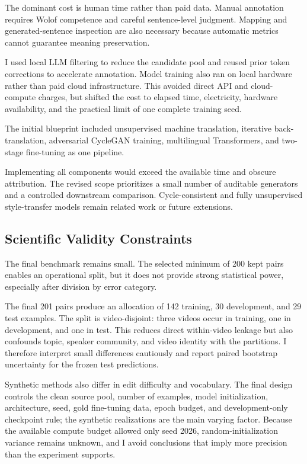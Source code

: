 \documentclass[12pt, a4paper, twoside, openany]{report}
\begin{document}
The dominant cost is human time rather than paid data. Manual annotation requires Wolof competence and careful sentence-level judgment. Mapping and generated-sentence inspection are also necessary because automatic metrics cannot guarantee meaning preservation.

I used local LLM filtering to reduce the candidate pool and reused prior token corrections to accelerate annotation. Model training also ran on local hardware rather than paid cloud infrastructure. This avoided direct API and cloud-compute charges, but shifted the cost to elapsed time, electricity, hardware availability, and the practical limit of one complete training seed.

The initial blueprint included unsupervised machine translation, iterative back-translation, adversarial CycleGAN training, multilingual Transformers, and two-stage fine-tuning as one pipeline.

Implementing all components would exceed the available time and obscure attribution. The revised scope prioritizes a small number of auditable generators and a controlled downstream comparison. Cycle-consistent and fully unsupervised style-transfer models remain related work or future extensions.

\medskip

\subsection{Scientific Validity Constraints}

The final benchmark remains small. The selected minimum of 200 kept pairs enables an operational split, but it does not provide strong statistical power, especially after division by error category.

The final 201 pairs produce an allocation of 142 training, 30 development, and 29 test examples. The split is video-disjoint: three videos occur in training, one in development, and one in test. This reduces direct within-video leakage but also confounds topic, speaker community, and video identity with the partitions. I therefore interpret small differences cautiously and report paired bootstrap uncertainty for the frozen test predictions.

Synthetic methods also differ in edit difficulty and vocabulary. The final design controls the clean source pool, number of examples, model initialization, architecture, seed, gold fine-tuning data, epoch budget, and development-only checkpoint rule; the synthetic realizations are the main varying factor. Because the available compute budget allowed only seed 2026, random-initialization variance remains unknown, and I avoid conclusions that imply more precision than the experiment supports.
\end{document}
